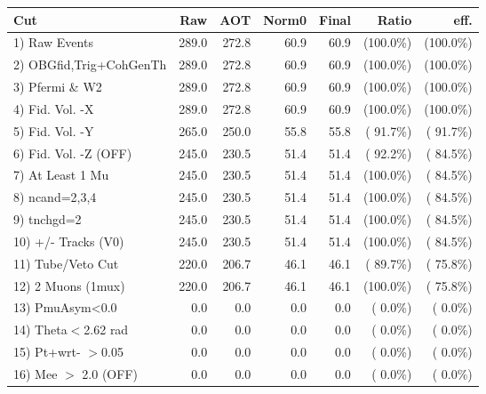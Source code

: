  \begin{table}[h!]\centering
 \begin{tabular}{||l||r|r|r|r|r|r||}
 \hline
 \hline
 Cut & Raw & AOT & Norm0 & Final & Ratio & eff.       \\
 \hline
  1) Raw Events           &        289.0 &        272.8 &         60.9 &         60.9 & (100.0\%) & (100.0\%) \\
  2) OBGfid,Trig+CohGenTh &        289.0 &        272.8 &         60.9 &         60.9 & (100.0\%) & (100.0\%) \\
  3) Pfermi \& W2         &        289.0 &        272.8 &         60.9 &         60.9 & (100.0\%) & (100.0\%) \\
  4) Fid. Vol. -X         &        289.0 &        272.8 &         60.9 &         60.9 & (100.0\%) & (100.0\%) \\
  5) Fid. Vol. -Y         &        265.0 &        250.0 &         55.8 &         55.8 & ( 91.7\%) & ( 91.7\%) \\
  6) Fid. Vol. -Z (OFF)   &        245.0 &        230.5 &         51.4 &         51.4 & ( 92.2\%) & ( 84.5\%) \\
  7) At Least 1 Mu        &        245.0 &        230.5 &         51.4 &         51.4 & (100.0\%) & ( 84.5\%) \\
  8) ncand=2,3,4          &        245.0 &        230.5 &         51.4 &         51.4 & (100.0\%) & ( 84.5\%) \\
  9) tnchgd=2             &        245.0 &        230.5 &         51.4 &         51.4 & (100.0\%) & ( 84.5\%) \\
 10) +/- Tracks (V0)      &        245.0 &        230.5 &         51.4 &         51.4 & (100.0\%) & ( 84.5\%) \\
 11) Tube/Veto Cut        &        220.0 &        206.7 &         46.1 &         46.1 & ( 89.7\%) & ( 75.8\%) \\
 12) 2 Muons (1mux)       &        220.0 &        206.7 &         46.1 &         46.1 & (100.0\%) & ( 75.8\%) \\
 13) PmuAsym<0.0          &          0.0 &          0.0 &          0.0 &          0.0 & (  0.0\%) & (  0.0\%) \\
 14) Theta$<$2.62 rad     &          0.0 &          0.0 &          0.0 &          0.0 & (  0.0\%) & (  0.0\%) \\
 15) Pt+wrt- $>$0.05      &          0.0 &          0.0 &          0.0 &          0.0 & (  0.0\%) & (  0.0\%) \\
 16) Mee $>$ 2.0  (OFF)   &          0.0 &          0.0 &          0.0 &          0.0 & (  0.0\%) & (  0.0\%) \\

\end{tabular}
\end{table}
